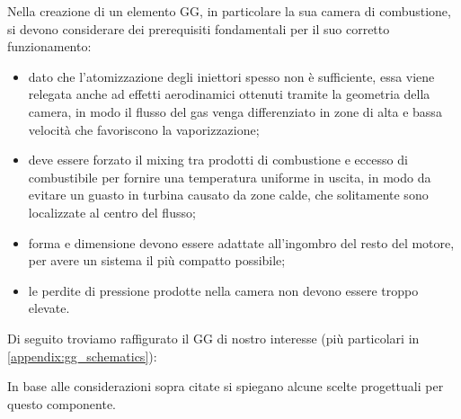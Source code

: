 Nella creazione di un elemento GG, in particolare la sua camera di combustione, si devono considerare dei prerequisiti fondamentali per il suo corretto funzionamento:

\begin{itemize}[wide,itemsep=3pt,topsep=3pt]

\item
dato che l'atomizzazione degli iniettori spesso non è sufficiente, essa viene relegata anche ad effetti aerodinamici ottenuti tramite la geometria della camera, in modo il flusso del gas venga differenziato in zone di alta e bassa velocità che favoriscono la vaporizzazione;

\item
deve essere forzato il mixing tra prodotti di combustione e eccesso di combustibile per fornire una temperatura uniforme in uscita, in modo da evitare un guasto in turbina causato da zone calde, che solitamente sono localizzate al centro del flusso;

\item
forma e dimensione devono essere adattate all'ingombro del resto del motore, per avere un sistema il più compatto possibile;

\item
le perdite di pressione prodotte nella camera non devono essere troppo elevate.

\end{itemize}

Di seguito troviamo raffigurato il GG di nostro interesse (più particolari in \autoref{appendix:gg_schematics}):



In base alle considerazioni sopra citate si spiegano alcune scelte progettuali per questo componente.

